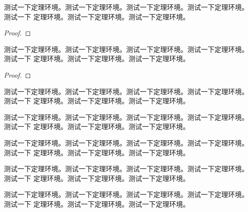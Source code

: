 \blindtext

\begin{theorem}
    测试一下定理环境。测试一下定理环境。测试一下定理环境。测试一下定理环境。测试一下
    定理环境。测试一下定理环境。测试一下定理环境。
\end{theorem}
\begin{proof}
    \blindtext
\end{proof}

\blindtext

\begin{lemma}
    测试一下定理环境。测试一下定理环境。测试一下定理环境。测试一下定理环境。测试一下
    定理环境。测试一下定理环境。测试一下定理环境。
\end{lemma}
\begin{proof}
    \blindtext
\end{proof}

\blindtext

\begin{definition}
    测试一下定理环境。测试一下定理环境。测试一下定理环境。测试一下定理环境。测试一下
    定理环境。测试一下定理环境。测试一下定理环境。
\end{definition}

\blindtext

\begin{corollary}
    测试一下定理环境。测试一下定理环境。测试一下定理环境。测试一下定理环境。测试一下
    定理环境。测试一下定理环境。测试一下定理环境。
\end{corollary}

\blindtext

\begin{proposition}
    测试一下定理环境。测试一下定理环境。测试一下定理环境。测试一下定理环境。测试一下
    定理环境。测试一下定理环境。测试一下定理环境。
\end{proposition}

\blindtext

\begin{fact}
    测试一下定理环境。测试一下定理环境。测试一下定理环境。测试一下定理环境。测试一下
    定理环境。测试一下定理环境。测试一下定理环境。
\end{fact}

\blindtext

\begin{assumption}
    测试一下定理环境。测试一下定理环境。测试一下定理环境。测试一下定理环境。测试一下
    定理环境。测试一下定理环境。测试一下定理环境。
\end{assumption}

